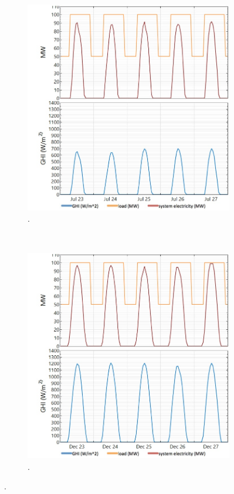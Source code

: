 \begin{figure}[!htbp]
        \centering                
        \begin{subfigure}[b]{0.5\textwidth}
                \centering
                \includegraphics[width=1\textwidth]{FIG/PVwhithoutEESwinter}
                \caption{.}\label{PVwhithoutEESwinter}
        \end{subfigure}%
        ~
        \begin{subfigure}[b]{0.5\textwidth}
                \centering
                \includegraphics[width=1\textwidth]{FIG/PVwhithoutEESsummer}
                \caption{.}\label{PVwhithoutEESsummer}
        \end{subfigure}
        \caption[.]{.}\label{PVwhithoutEES}
\end{figure}


